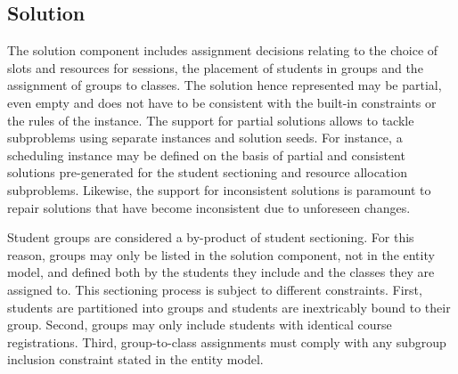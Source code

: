 \subsection{Solution}
\label{sec:solution}
The solution component includes assignment decisions
relating to the choice of slots and resources for sessions,
the placement of students in groups and
the assignment of groups to classes.
The solution hence represented may be partial, even empty 
and does not have to be consistent with the built-in constraints or the rules of the instance.
The support for partial solutions allows to tackle subproblems using separate {\UTP} instances and solution seeds.
For instance, a scheduling instance may be defined on the basis of partial and consistent solutions pre-generated for the student sectioning and resource allocation subproblems.
Likewise, the support for inconsistent solutions is paramount to repair solutions that have become inconsistent due to unforeseen changes.

Student groups are considered a by-product of student sectioning.
For this reason, groups may only be listed in the solution component, not in the entity model, and defined both by the students they include and the classes they are assigned to. 
This sectioning process is subject to different constraints. 
First, students are partitioned into groups and students are inextricably bound to their group.
Second, groups may only include students with identical course registrations.
Third, group-to-class assignments must comply with any subgroup inclusion constraint stated in the entity model.






